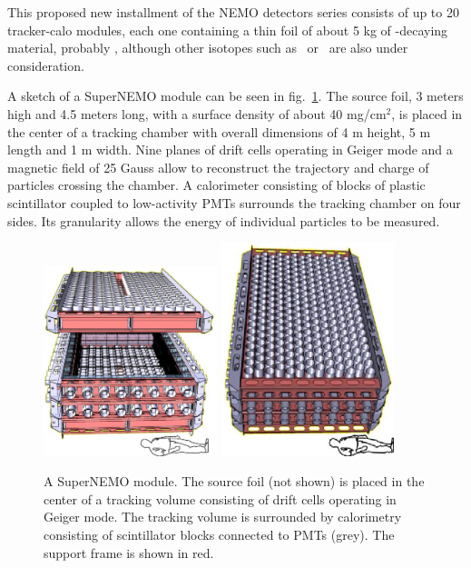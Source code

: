 This proposed new installment of the NEMO detectors series consists of up to 20 tracker-calo modules, each one containing a thin foil of about 5 kg of \bb-decaying material, probably \SE, although other isotopes such as \ND\ or \CA\ are also under consideration. 

A sketch of a SuperNEMO module can be seen in fig.~\ref{fig:snemo}. The source foil, 3 meters high and 4.5 meters long, with a surface density of about 40 mg/cm$^{2}$, is placed in the center of a tracking chamber with overall dimensions of 4 m height, 5 m length and 1 m width. Nine planes of drift cells operating in Geiger mode and a magnetic field of 25 Gauss allow to reconstruct the trajectory and charge of particles crossing the chamber. A calorimeter consisting of blocks of plastic scintillator coupled to low-activity PMTs surrounds the tracking chamber on four sides. Its granularity allows the energy of individual particles to be measured.

\begin{figure}[t!b!]
\begin{center}
\includegraphics[angle=270,width=0.45\textwidth]{img/snemo-1.eps} \hspace{0.04\textwidth}
\includegraphics[angle=270,width=0.45\textwidth]{img/snemo-2.eps}
\end{center}
\caption{A SuperNEMO module. The source foil (not shown) is placed in the center of a tracking volume consisting of drift cells operating in Geiger mode. The tracking volume is surrounded by calorimetry consisting of scintillator blocks connected to PMTs (grey). The support frame is shown in red.} \label{fig:snemo}
\end{figure}

